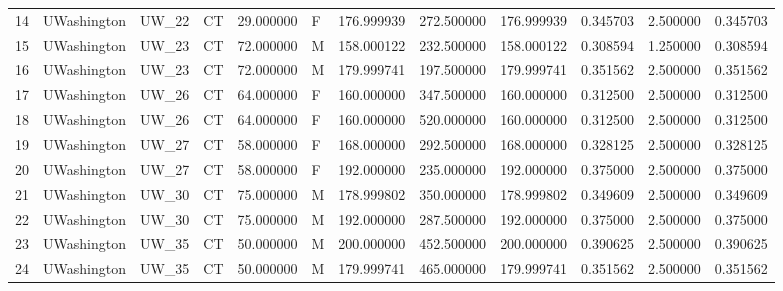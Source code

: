 \begin{tabular}{llllrlrrrrrr}
14     &     UWashington &        UW\_22 &                 CT &  29.000000 &        F &       176.999939 &    272.500000 &  176.999939 &               0.345703 &            2.500000 &          0.345703 \\
15     &     UWashington &        UW\_23 &                 CT &  72.000000 &        M &       158.000122 &    232.500000 &  158.000122 &               0.308594 &            1.250000 &          0.308594 \\
16     &     UWashington &        UW\_23 &                 CT &  72.000000 &        M &       179.999741 &    197.500000 &  179.999741 &               0.351562 &            2.500000 &          0.351562 \\
17     &     UWashington &        UW\_26 &                 CT &  64.000000 &        F &       160.000000 &    347.500000 &  160.000000 &               0.312500 &            2.500000 &          0.312500 \\
18     &     UWashington &        UW\_26 &                 CT &  64.000000 &        F &       160.000000 &    520.000000 &  160.000000 &               0.312500 &            2.500000 &          0.312500 \\
19     &     UWashington &        UW\_27 &                 CT &  58.000000 &        F &       168.000000 &    292.500000 &  168.000000 &               0.328125 &            2.500000 &          0.328125 \\
20     &     UWashington &        UW\_27 &                 CT &  58.000000 &        F &       192.000000 &    235.000000 &  192.000000 &               0.375000 &            2.500000 &          0.375000 \\
21     &     UWashington &        UW\_30 &                 CT &  75.000000 &        M &       178.999802 &    350.000000 &  178.999802 &               0.349609 &            2.500000 &          0.349609 \\
22     &     UWashington &        UW\_30 &                 CT &  75.000000 &        M &       192.000000 &    287.500000 &  192.000000 &               0.375000 &            2.500000 &          0.375000 \\
23     &     UWashington &        UW\_35 &                 CT &  50.000000 &        M &       200.000000 &    452.500000 &  200.000000 &               0.390625 &            2.500000 &          0.390625 \\
24     &     UWashington &        UW\_35 &                 CT &  50.000000 &        M &       179.999741 &    465.000000 &  179.999741 &               0.351562 &            2.500000 &          0.351562 \\

\end{tabular}
